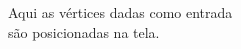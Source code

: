 \documentclass[preview]{standalone}
\begin{document}
Aqui as vértices dadas como entrada\\são posicionadas na tela.\\
\end{document}
